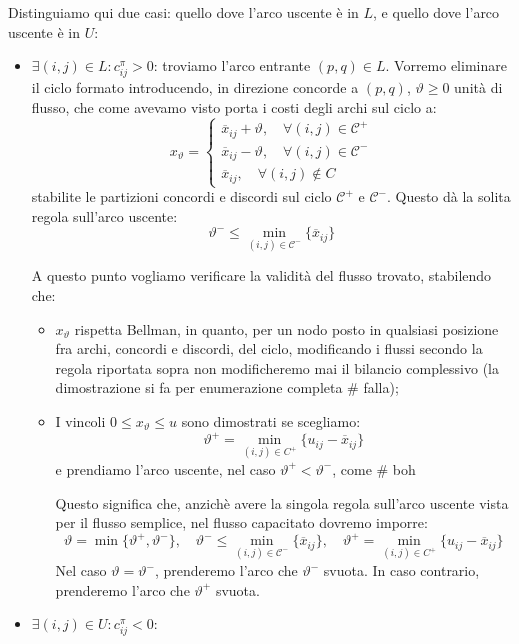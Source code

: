 \documentclass[a4paper,11pt]{article}
\begin{document}
Distinguiamo qui due casi: quello dove l'arco uscente è in $L$, e quello dove l'arco uscente è in $U$:
\begin{itemize}
	\item $\exists (i, j) \in L : c_{ij}^\pi > 0$: troviamo l'arco entrante $(p, q) \in L$. 
		Vorremo eliminare il ciclo formato introducendo, in direzione concorde a $(p, q)$, $\vartheta \geq 0$ unità di flusso, che come avevamo visto porta i costi degli archi sul ciclo a:
$$
x_\vartheta =
	\begin{cases}
		\overline{x}_{ij} + \vartheta, \quad \forall (i, j) \in \mathcal{C}^+ \\ 
		\overline{x}_{ij} - \vartheta, \quad \forall (i, j) \in \mathcal{C}^- \\
		\overline{x}_{ij}, \quad \forall (i, j) \notin C
	\end{cases}
$$
stabilite le partizioni concordi e discordi sul ciclo $\mathcal{C}^+$ e $\mathcal{C}^-$. 
Questo dà la solita regola sull'arco uscente: 
$$ \vartheta^- \leq \min_{(i, j) \in \mathcal{C}^-} \{ \overline{x}_{ij} \} $$

A questo punto vogliamo verificare la validità del flusso trovato, stabilendo che:
\begin{itemize}
	\item $x_\vartheta$ rispetta Bellman, in quanto, per un nodo posto in qualsiasi posizione fra archi, concordi e discordi, del ciclo, modificando i flussi secondo la regola riportata sopra non modificheremo mai il bilancio complessivo (la dimostrazione si fa per enumerazione completa # falla);
	\item I vincoli $0 \leq x_\vartheta \leq u$ sono dimostrati se scegliamo:
		$$
		\vartheta^+ = \min_{(i, j) \in C^+} \{ u_{ij} - \overline{x}_{ij} \}
		$$
		e prendiamo l'arco uscente, nel caso $\vartheta^+ < \vartheta^-$, come # boh

		Questo significa che, anzichè avere la singola regola sull'arco uscente vista per il flusso semplice, nel flusso capacitato dovremo imporre:
		$$
		\vartheta = \min \{ \vartheta^+, \vartheta^- \}, \quad \vartheta^- \leq \min_{(i, j) \in \mathcal{C}^-} \{ \overline{x}_{ij} \}, \quad \vartheta^+ = \min_{(i, j) \in C^+} \{ u_{ij} - \overline{x}_{ij} \}
		$$
		Nel caso $\vartheta = \vartheta^-$, prenderemo l'arco che $\vartheta^-$ svuota.
		In caso contrario, prenderemo l'arco che $\vartheta^+$ svuota.
\end{itemize}
	\item $\exists (i, j) \in U : c_{ij}^\pi < 0$:
\end{itemize}
\end{document}
